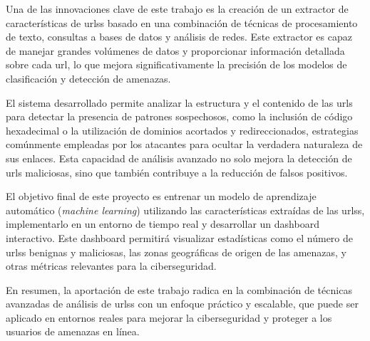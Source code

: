 Una de las innovaciones clave de este trabajo es la creación de un extractor de características de \glspl{urls} basado en una combinación de técnicas de procesamiento de texto, consultas a bases de datos y análisis de redes. Este extractor es capaz de manejar grandes volúmenes de datos y proporcionar información detallada sobre cada \gls{url}, lo que mejora significativamente la precisión de los modelos de clasificación y detección de amenazas.

El sistema desarrollado permite analizar la estructura y el contenido de las \glspl{url} para detectar la presencia de patrones sospechosos, como la inclusión de código hexadecimal o la utilización de dominios acortados y redireccionados, estrategias comúnmente empleadas por los atacantes para ocultar la verdadera naturaleza de sus enlaces. Esta capacidad de análisis avanzado no solo mejora la detección de \glspl{url} maliciosas, sino que también contribuye a la reducción de falsos positivos.

El objetivo final de este proyecto es entrenar un modelo de aprendizaje automático (\textit{machine learning}) utilizando las características extraídas de las \glspl{urls}, implementarlo en un entorno de tiempo real y desarrollar un \gls{dashboard} interactivo. Este \gls{dashboard} permitirá visualizar estadísticas como el número de \glspl{urls} benignas y maliciosas, las zonas geográficas de origen de las amenazas, y otras métricas relevantes para la ciberseguridad.

En resumen, la aportación de este trabajo radica en la combinación de técnicas avanzadas de análisis de \glspl{urls} con un enfoque práctico y escalable, que puede ser aplicado en entornos reales para mejorar la ciberseguridad y proteger a los usuarios de amenazas en línea.

